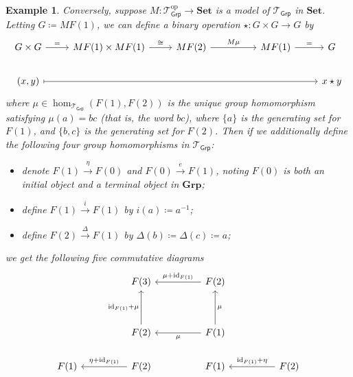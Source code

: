 \documentclass[a4paper,11pt]{article}
\theoremstyle{break_italics}
\theoremstyle{break_upright}
\newtheorem*{example*}{Example}
\theoremstyle{remark}
\newcommand{\id}{\mathrm{id}}
\newcommand{\Set}{\mathbf{Set}}
\newcommand{\op}{\mathrm{op}}
\begin{document}
\begin{example*}
	Conversely, suppose $M \colon \mathcal T_{\mathsf{Grp}}^\op \to \Set$ is a model of $\mathcal T_{\mathsf{Grp}}$ in $\Set$. Letting $G \coloneqq MF(1)$, we can define a binary operation $\star \colon G \times G \to G$ by
	\[
\begin{tikzcd}
G \times G \arrow[r, "="]      & MF(1) \times MF(1) \arrow[r, "\cong"] & MF(2) \arrow[rr, "{M\mu}"] &  & MF(1) \arrow[r, "="] & G   \\
{(x,y)} \arrow[rrrrr, maps to] &                                           &                                    &  &                        & x \star y
\end{tikzcd}
	\]
	where $\mu \in \hom_{\mathcal T_{\mathsf{Grp}}}(F(1),F(2))$ is the unique group homomorphism satisfying $\mu(a) = bc$ (that is, the \textit{word} $bc$), where $\{a\}$ is the generating set for $F(1)$, and $\{b,c\}$ is the generating set for $F(2)$. Then if we additionally define the following four group homomorphisms in $\mathcal T_{\mathsf{Grp}}$:
	\begin{itemize}
		\item denote $F(1) \xrightarrow{\eta} F(0)$ and $F(0) \xrightarrow{e} F(1)$, noting $F(0)$ is both an initial object and a terminal object in $\mathbf{Grp}$;
		\item define $F(1) \xrightarrow{i} F(1)$ by $i(a) \coloneqq a^{-1}$;
		\item define $F(2) \xrightarrow{\Delta} F(1)$ by $\Delta(b) \coloneqq \Delta(c) \coloneqq a$;
	\end{itemize}
	we get the following five commutative diagrams
\[
\begin{tikzcd}
                          &                                   & F(3)                                               &  & F(2) \arrow[ll, "\mu+\id_{F(1)}"']        &                                   &                                                    \\
                          &                                   &                                                    &  &                                           &                                   &                                                    \\
                          &                                   & F(2) \arrow[uu, "\id_{F(1)} + \mu"]                &  & F(1) \arrow[ll, "\mu"] \arrow[uu, "\mu"'] &                                   &                                                    \\
F(1)                      &                                   & F(2) \arrow[ll, "\eta + \id_{F(1)}"']              &  & F(1)                                      &                                   & F(2) \arrow[ll, "\id_{F(1)} + \eta"']              \\

\end{tikzcd}\]
\end{example*}
\end{document}
